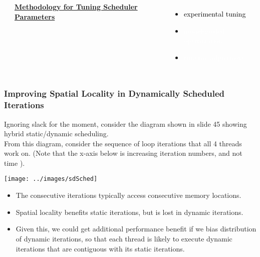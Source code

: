 \begin{frame}[label=locOptHybrid]
\begin{columns}[T]
\begin{itemize}
       \end{itemize}
    {\tiny \underline{\textbf { Methodology for Tuning Scheduler Parameters}}}
    \begin{itemize}
      \tiny \item \tiny \textcolor{black} {experimental tuning}
    \item \tiny \textcolor{white} {model-guided optimization} %
    \item \tiny \textcolor{white} {runtime adjustment} %
    \end{itemize}
\end{columns}
\end{frame}


\begin{frame}
\frametitle{Improving Spatial Locality in Dynamically Scheduled Iterations}
{\tiny Ignoring slack for the moment, consider the diagram shown in slide 45
  showing hybrid static/dynamic scheduling. \\}
{\tiny  From this diagram, consider the sequence of loop iterations that
  all 4 threads work on. (Note that the x-axis below is increasing
  iteration numbers, and not time ). \\} 
\begin{center}
\texttt{[image: ../images/sdSched]} \\
\end{center}
\begin{itemize}
\small \item \small The consecutive iterations typically access consecutive memory locations. 
\item \small Spatial locality benefits static iterations, but is lost in dynamic iterations. 
\item \small Given this, we could get additional performance benefit if we bias distribution of dynamic iterations, so that each thread is likely to execute dynamic iterations 
that are contiguous with its static iterations.  
\end{itemize}
\end{frame}

